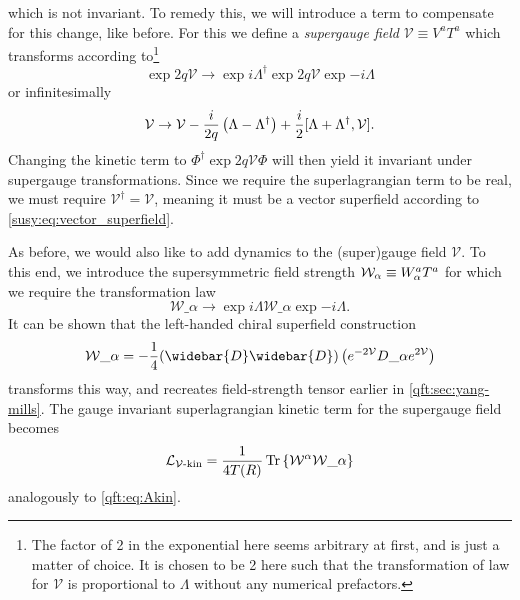 \documentclass[../main.tex]{subfiles}
\begin{document}
which is not invariant.
To remedy this, we will introduce a term to compensate for this change, like before.
For this we define a   \emph{supergauge field} \(\mathcal{V} \equiv V^a T^a\) which transforms according to\footnote{The factor of 2 in the exponential here seems arbitrary at first, and is just a matter of choice. It is chosen to be 2 here such that the transformation of law for \(\mathcal{V}\) is proportional to \(\Lambda\) without any numerical prefactors.}
\begin{equation}
  \exp{2q\mathcal{V}} \to \exp{i\Lambda^\dagger} \exp{2q\mathcal{V}} \exp{-i\Lambda}
\end{equation}
or infinitesimally
\begin{equation}
  \mathcal{V} \to \mathcal{V} - \frac{i}{2q} \left(\Lambda - \Lambda^\dagger\right) + \frac{i}{2} [\Lambda + \Lambda^\dagger,\mathcal{V}].
\end{equation}
Changing the kinetic term to \(\Phi^\dagger \exp{2q\mathcal{V}} \Phi\) will then yield it invariant under supergauge transformations.
Since we require the superlagrangian term to be real, we must require \(\mathcal{V}^\dagger = \mathcal{V}\), meaning it must be a vector superfield according to \cref{susy:eq:vector_superfield}.

As before, we would also like to add dynamics to the (super)gauge field \(\mathcal{V}\).
To this end, we introduce the supersymmetric field strength \(\mathcal{W}_\alpha \equiv W\indices*{^a_\alpha} T^a\) for which we require the transformation law
\begin{equation}
  \mathcal{W}\_\alpha \to \exp{i\Lambda} \mathcal{W}\_\alpha \exp{-i\Lambda}.
\end{equation}
It can be shown that the left-handed chiral superfield construction
\begin{equation}
  \label{susy:eq:superfield_strength}
  \mathcal{W}\_\alpha = -\frac{1}{4} (\widebar{D}\widebar{D}) \pclosed{\exp{-2\mathcal{V}} D\_\alpha \exp{2\mathcal{V}}}
\end{equation}
transforms this way, and recreates field-strength tensor earlier in \cref{qft:sec:yang-mills}.\cite{Martin:1997ns}
The gauge invariant superlagrangian kinetic term for the supergauge field becomes
\begin{equation}
  \label{susy:eq:Vkin}
  \L_{\mathcal{V}\text{-kin}} = \frac{1}{4 T(R)} \tr\cclosed{ \mathcal{W}\^\alpha \mathcal{W}\_\alpha }
\end{equation}
analogously to \cref{qft:eq:Akin}.
\end{document}
